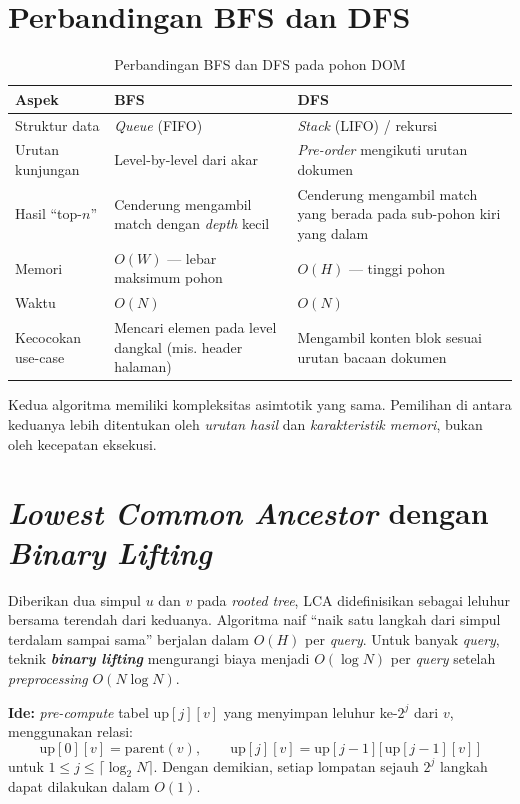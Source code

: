 \section{Perbandingan BFS dan DFS}

\begin{table}[H]
\centering
\caption{Perbandingan BFS dan DFS pada pohon DOM}
\begin{tabularx}{\textwidth}{|l|X|X|}
\hline
\textbf{Aspek} & \textbf{BFS} & \textbf{DFS} \\
\hline
Struktur data & \textit{Queue} (FIFO) & \textit{Stack} (LIFO) / rekursi \\
\hline
Urutan kunjungan & Level-by-level dari akar & \textit{Pre-order} mengikuti urutan dokumen \\
\hline
Hasil ``top-$n$'' & Cenderung mengambil match dengan \textit{depth} kecil & Cenderung mengambil match yang berada pada sub-pohon kiri yang dalam \\
\hline
Memori & $O(W)$ --- lebar maksimum pohon & $O(H)$ --- tinggi pohon \\
\hline
Waktu & $O(N)$ & $O(N)$ \\
\hline
Kecocokan use-case & Mencari elemen pada level dangkal (mis. header halaman) & Mengambil konten blok sesuai urutan bacaan dokumen \\
\hline
\end{tabularx}
\end{table}

Kedua algoritma memiliki kompleksitas asimtotik yang sama. Pemilihan di antara keduanya lebih ditentukan oleh \textit{urutan hasil} dan \textit{karakteristik memori}, bukan oleh kecepatan eksekusi.

\section{\textit{Lowest Common Ancestor} dengan \textit{Binary Lifting}}

Diberikan dua simpul $u$ dan $v$ pada \textit{rooted tree}, LCA didefinisikan sebagai leluhur bersama terendah dari keduanya. Algoritma naif ``naik satu langkah dari simpul terdalam sampai sama'' berjalan dalam $O(H)$ per \textit{query}. Untuk banyak \textit{query}, teknik \textbf{\textit{binary lifting}} mengurangi biaya menjadi $O(\log N)$ per \textit{query} setelah \textit{preprocessing} $O(N \log N)$.

\textbf{Ide:} \textit{pre-compute} tabel $\mathrm{up}[j][v]$ yang menyimpan leluhur ke-$2^j$ dari $v$, menggunakan relasi:
\[
    \mathrm{up}[0][v] = \mathrm{parent}(v), \qquad
    \mathrm{up}[j][v] = \mathrm{up}[j-1]\bigl[\,\mathrm{up}[j-1][v]\,\bigr]
\]
untuk $1 \le j \le \lceil \log_2 N \rceil$. Dengan demikian, setiap lompatan sejauh $2^j$ langkah dapat dilakukan dalam $O(1)$.

